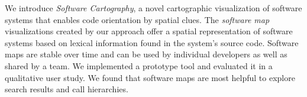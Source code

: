 \documentclass[10pt]{book}
\begin{document}
We introduce \emph{Software Cartography}, a novel cartographic visualization of software systems that enables code orientation by spatial clues. The \emph{software map} visualizations created by our approach offer a spatial representation of software systems based on lexical information found in the system's source code. 
Software maps are stable over time and can be used by individual developers as well as shared by a team. 
We implemented a prototype tool and evaluated it in a qualitative user study. We found that software maps are most helpful to explore search results and call hierarchies.

\setcounter{tocdepth}{1}
\tableofcontents






\end{document}
